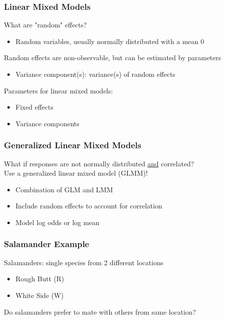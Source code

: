 \documentclass{beamer}
\begin{document}
\begin{frame}
\frametitle{Linear Mixed Models}

What are "random" effects?
\begin{itemize}
    \item[] Random variables, usually normally distributed with a mean 0
\end{itemize}
\vspace{.5cm}
Random effects are non-observable, but can be estimated by parameters
\begin{itemize}
    \item[] Variance component(s): variance(s) of random effects
\end{itemize}
\vspace{.5cm}
Parameters for linear mixed models:
\begin{itemize}
    \item Fixed effects
    \item Variance components
\end{itemize}

\end{frame}

\begin{frame}
\frametitle{Generalized Linear Mixed Models}

What if responses are not normally distributed \underline{and} correlated? \\
\vspace{.5cm}
Use a generalized linear mixed model (GLMM)!
\begin{itemize}
    \item Combination of GLM and LMM
    \item Include random effects to account for correlation
    \item Model log odds or log mean
\end{itemize}

\end{frame}

\begin{frame}
\frametitle{Salamander Example}

Salamanders: single species from 2 different locations
\begin{itemize}
    \item Rough Butt (R)
    \item White Side (W)
\end{itemize}
\vspace{.25cm}
Do salamanders prefer to mate with others from same location?

\end{frame}
\end{document}
